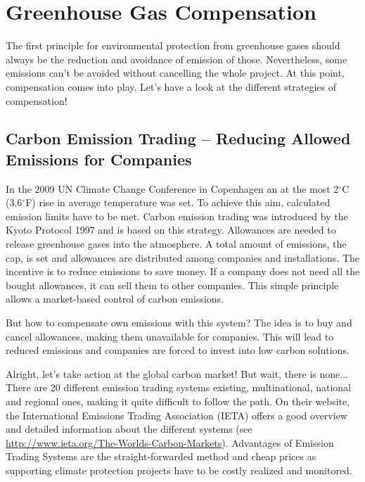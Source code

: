 
\chapter{Greenhouse Gas Compensation}\label{chap:compensation}

The first principle for environmental protection from greenhouse gases should always be the reduction and avoidance of emission of those.  Nevertheless, some emissions can't be avoided without cancelling the whole project. At this point, compensation comes into play. 
Let's have a look at the different strategies of compensation!

\section{Carbon Emission Trading -- Reducing Allowed Emissions for Companies} 

In the 2009 UN Climate Change Conference in Copenhagen an at the most 2$^\circ$C (3.6$^\circ$F) rise in average temperature was set. \cite{copenhagen} To achieve this aim, calculated emission limits have to be met. Carbon emission trading was introduced by the Kyoto Protocol 1997 and is based on this strategy. Allowances are needed to release greenhouse gases into the atmosphere. A total amount of emissions, the cap, is set and allowances are distributed among companies and installations. The incentive is to reduce emissions to save money. If a company does not need all the bought allowances, it can sell them to other companies. This simple principle allows a market-based control of carbon emissions.
\cite{bmub_Emission_Trading}


But how to compensate own emissions with this system? The idea is to buy and cancel allowances, making them unavailable for companies. This will lead to reduced emissions and companies are forced to invest into low carbon solutions. 
\cite{climakind}


Alright, let's take action at the global carbon market! But wait, there is none... There are 20 different emission trading systems existing, multinational, national and regional ones, making it quite difficult to follow the path. On their website, the International Emissions Trading Association (IETA) offers a good overview and detailed information about the different systems (see \url{http://www.ieta.org/The-Worlds-Carbon-Markets}).%
Advantages of Emission Trading Systems are the straight-forwarded method and cheap prices as supporting climate protection projects have to be costly realized and monitored.


